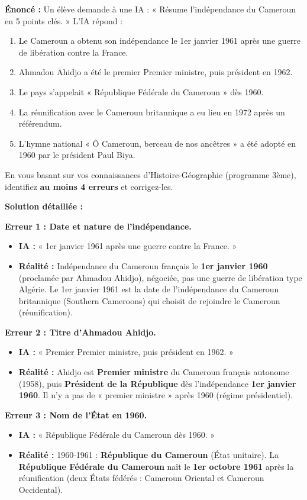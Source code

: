 \documentclass[11pt]{article}
\begin{document}
\begin{exoresolu}
\textbf{Énoncé :} Un élève demande à une IA : « Résume l'indépendance du Cameroun en 5 points clés. » L'IA répond :
\begin{enumerate}
    \item Le Cameroun a obtenu son indépendance le 1er janvier 1961 après une guerre de libération contre la France.
    \item Ahmadou Ahidjo a été le premier Premier ministre, puis président en 1962.
    \item Le pays s'appelait « République Fédérale du Cameroun » dès 1960.
    \item La réunification avec le Cameroun britannique a eu lieu en 1972 après un référendum.
    \item L'hymne national « Ô Cameroun, berceau de nos ancêtres » a été adopté en 1960 par le président Paul Biya.
\end{enumerate}
En vous basant sur vos connaissances d'Histoire-Géographie (programme 3ème), identifiez \textbf{au moins 4 erreurs} et corrigez-les.

\tcblower
\textbf{Solution détaillée :}

\textbf{Erreur 1 : Date et nature de l'indépendance.}
\begin{itemize}
    \item \textbf{IA :} « 1er janvier 1961 après une guerre contre la France. »
    \item \textbf{Réalité :} Indépendance du Cameroun français le \textbf{1er janvier 1960} (proclamée par Ahmadou Ahidjo), négociée, pas une guerre de libération type Algérie. Le 1er janvier 1961 est la date de l'indépendance du Cameroun britannique (Southern Cameroons) qui choisit de rejoindre le Cameroun (réunification).
\end{itemize}

\textbf{Erreur 2 : Titre d'Ahmadou Ahidjo.}
\begin{itemize}
    \item \textbf{IA :} « Premier Premier ministre, puis président en 1962. »
    \item \textbf{Réalité :} Ahidjo est \textbf{Premier ministre} du Cameroun français autonome (1958), puis \textbf{Président de la République} dès l'indépendance \textbf{1er janvier 1960}. Il n'y a pas de « premier ministre » après 1960 (régime présidentiel).
\end{itemize}

\textbf{Erreur 3 : Nom de l'État en 1960.}
\begin{itemize}
    \item \textbf{IA :} « République Fédérale du Cameroun dès 1960. »
    \item \textbf{Réalité :} 1960-1961 : \textbf{République du Cameroun} (État unitaire). La \textbf{République Fédérale du Cameroun} naît le \textbf{1er octobre 1961} après la réunification (deux États fédérés : Cameroun Oriental et Cameroun Occidental).
\end{itemize}


\end{exoresolu}
\end{document}
